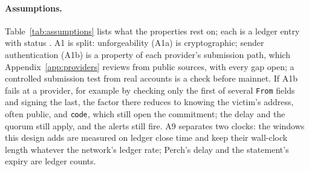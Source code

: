 \paragraph{Assumptions.} Table~\ref{tab:assumptions} lists what the
properties rest on; each is a ledger entry with status .
A1 is split: unforgeability (A1a) is cryptographic; sender authentication
(A1b) is a property of each provider's submission path, which
Appendix~\ref{app:providers} reviews from public sources, with every gap
open; a controlled submission test from real accounts is a check before
mainnet. If A1b fails at a provider, for example by checking only the first
of several \texttt{From} fields and signing the last, the factor there
reduces to knowing the victim's address, often public, and $\mathsf{code}$, which
still open the commitment; the delay and the
quorum still apply, and the alerts still
fire. A9
separates two clocks: the windows this design adds are measured on ledger
close time and keep their wall-clock length whatever the network's ledger
rate; Perch's delay and the statement's expiry are ledger counts.

